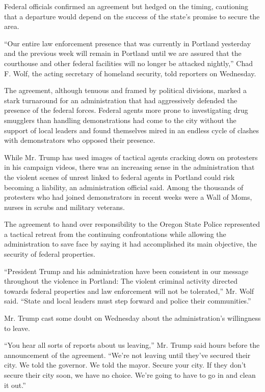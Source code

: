 Federal officials confirmed an agreement but hedged on the timing,
cautioning that a departure would depend on the success of the state's
promise to secure the area.

``Our entire law enforcement presence that was currently in Portland
yesterday and the previous week will remain in Portland until we are
assured that the courthouse and other federal facilities will no longer
be attacked nightly,'' Chad F. Wolf, the acting secretary of homeland
security, told reporters on Wednesday.

The agreement, although tenuous and framed by political divisions,
marked a stark turnaround for an administration that had aggressively
defended the presence of the federal forces. Federal agents more prone
to investigating drug smugglers than handling demonstrations had come to
the city without the support of local leaders and found themselves mired
in an endless cycle of clashes with demonstrators who opposed their
presence.

While Mr. Trump has used images of tactical agents cracking down on
protesters in his campaign videos, there was an increasing sense in the
administration that the violent scenes of unrest linked to federal
agents in Portland could risk becoming a liability, an administration
official said. Among the thousands of protesters who had joined
demonstrators in recent weeks were a Wall of Moms, nurses in scrubs and
military veterans.

The agreement to hand over responsibility to the Oregon State Police
represented a tactical retreat from the continuing confrontations while
allowing the administration to save face by saying it had accomplished
its main objective, the security of federal properties.

``President Trump and his administration have been consistent in our
message throughout the violence in Portland: The violent criminal
activity directed towards federal properties and law enforcement will
not be tolerated,'' Mr. Wolf said. ``State and local leaders must step
forward and police their communities.''

Mr. Trump cast some doubt on Wednesday about the administration's
willingness to leave.

``You hear all sorts of reports about us leaving,'' Mr. Trump said hours
before the announcement of the agreement. ``We're not leaving until
they've secured their city. We told the governor. We told the mayor.
Secure your city. If they don't secure their city soon, we have no
choice. We're going to have to go in and clean it out.''

